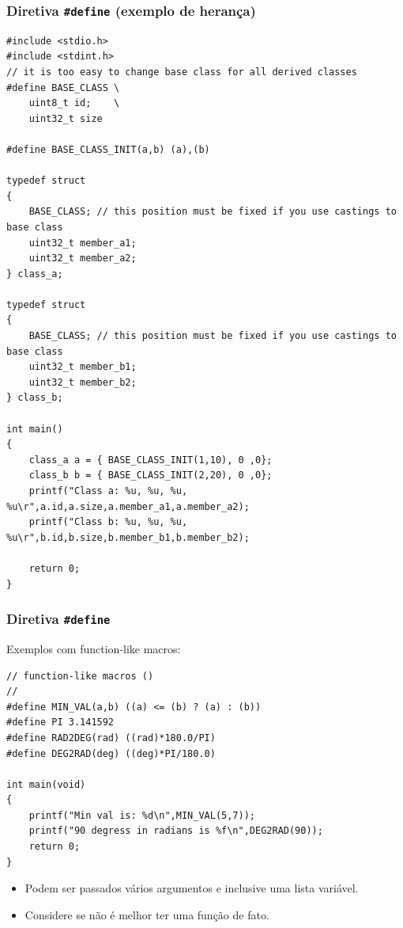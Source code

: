 \documentclass{beamer}
\begin{document}
\begin{frame}[fragile]
	\frametitle{Diretiva \texttt{\#define} (exemplo de herança)}

	\begin{lstlisting}[style=customc]
#include <stdio.h>
#include <stdint.h>
// it is too easy to change base class for all derived classes
#define BASE_CLASS \
    uint8_t id;    \
    uint32_t size

#define BASE_CLASS_INIT(a,b) (a),(b)

typedef struct
{
	BASE_CLASS; // this position must be fixed if you use castings to base class
    uint32_t member_a1;
    uint32_t member_a2;
} class_a;

typedef struct
{
	BASE_CLASS; // this position must be fixed if you use castings to base class
    uint32_t member_b1;
    uint32_t member_b2;
} class_b;

int main()
{
    class_a a = { BASE_CLASS_INIT(1,10), 0 ,0};
    class_b b = { BASE_CLASS_INIT(2,20), 0 ,0};
    printf("Class a: %u, %u, %u, %u\r",a.id,a.size,a.member_a1,a.member_a2);
    printf("Class b: %u, %u, %u, %u\r",b.id,b.size,b.member_b1,b.member_b2);

    return 0;
}
	\end{lstlisting}
\end{frame}

\begin{frame}[fragile]
	\frametitle{Diretiva \texttt{\#define}}
	Exemplos com function-like macros:
	\begin{lstlisting}[style=customc]
// function-like macros ()
//
#define MIN_VAL(a,b) ((a) <= (b) ? (a) : (b))
#define PI 3.141592
#define RAD2DEG(rad) ((rad)*180.0/PI)
#define DEG2RAD(deg) ((deg)*PI/180.0)

int main(void)
{
	printf("Min val is: %d\n",MIN_VAL(5,7));
	printf("90 degress in radians is %f\n",DEG2RAD(90));
	return 0;
}
	\end{lstlisting}
    \begin{itemize}
    \item Podem ser passados vários argumentos e inclusive uma lista variável.
    \item Considere se não é melhor ter uma função de fato.
    \end{itemize}
\end{frame}
\end{document}
